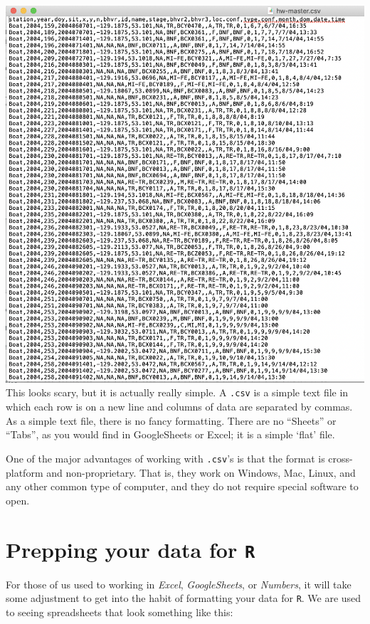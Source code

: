 \documentclass[
]{book}
\begin{document}
\includegraphics{img/csv_text_editor.png}
This looks scary, but it is actually really simple. A \texttt{.csv} is a simple text file in which each row is on a new line and columns of data are separated by commas. As a simple text file, there is no fancy formatting. There are no ``Sheets'' or ``Tabs'', as you would find in GoogleSheets or Excel; it is a simple `flat' file.

One of the major advantages of working with \texttt{.csv}'s is that the format is cross-platform and non-proprietary. That is, they work on Windows, Mac, Linux, and any other common type of computer, and they do not require special software to open.

\hypertarget{prepping-your-data-for-r}{%
\section*{\texorpdfstring{Prepping your data for \texttt{R}}{Prepping your data for R}}\label{prepping-your-data-for-r}}

For those of us used to working in \emph{Excel}, \emph{GoogleSheets}, or \emph{Numbers}, it will take some adjustment to get into the habit of formatting your data for \texttt{R}. We are used to seeing spreadsheets that look something like this:
\end{document}
